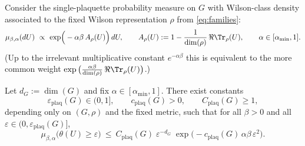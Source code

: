 Consider the single-plaquette probability measure on $G$ with Wilson-class density associated to the fixed Wilson representation $\rho$ from \eqref{eq:families}:
\[
\mu_{\beta,\alpha}(dU)\ \propto\ \exp\!\Big(-\alpha\beta\,A_\rho(U)\Big)\,dU,\qquad 
A_\rho(U):=1-\frac{1}{\dim(\rho)}\,\Re\Tr_{\rho}(U),\qquad \alpha\in[\alpha_{\min},1].
\]
(Up to the irrelevant multiplicative constant $e^{-\alpha\beta}$ this is equivalent to the more common weight
$\exp\big(\frac{\alpha\beta}{\dim(\rho)}\,\Re\Tr_{\rho}(U)\big)$.)

\begin{lemma}\label{lem:plaq_tail}
Let $d_G:=\dim(G)$ and fix $\alpha\in[\alpha_{\min},1]$.
There exist constants
\[
\varepsilon_{\mathrm{plaq}}(G)\in(0,1],\qquad c_{\mathrm{plaq}}(G)>0,\qquad C_{\mathrm{plaq}}(G)\ge 1,
\]
depending only on $(G,\rho)$ and the fixed metric, such that for all $\beta>0$ and all $\varepsilon\in(0,\varepsilon_{\mathrm{plaq}}(G)]$,
\begin{equation}\label{eq:plaq_tail}
\mu_{\beta,\alpha}\big(\theta(U)\ge \varepsilon\big)\ \le\ C_{\mathrm{plaq}}(G)\;\varepsilon^{-d_G}\;
\exp\!\Big(-c_{\mathrm{plaq}}(G)\,\alpha\beta\,\varepsilon^2\Big).
\end{equation}
\end{lemma}

